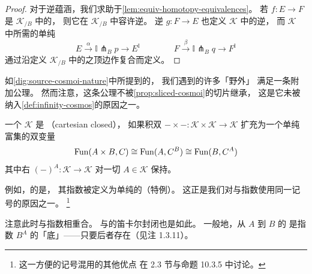 \begin{proof}
对于逆蕴涵，我们求助于\cref{lem:equiv-homotopy-equivalences}。
若 $f\colon E\to F$ 是 $\mathcal{K}_{/B}$ 中的\trEquivalence{}，
则它在 $\mathcal{K}_{/B}$ 中容许\trHomotopy{}逆。
逆\trEquivalence{} $g\colon F\to E$ 也定义 $\mathcal{K}$ 中的逆\trEquivalence{}，
而 $\mathcal{K}$ 中所需的单纯\trHomotopy
\begin{equation*}
E\xrightarrow{\ \alpha\ }\mathbb{I}\pitchfork_B p\longrightarrow E^{\mathbb{I}}
\qquad\qquad
F\xrightarrow{\ \beta\ }\mathbb{I}\pitchfork_B q\longrightarrow F^{\mathbb{I}}
\end{equation*}
通过沿定义 $\mathcal{K}_{/B}$ 中\trCotensor{}的\trPullback{}之顶边作复合而定义。
\end{proof}

如\cref{dig:source-cosmoi-nature}中所提到的，
我们遇到的许多「野外」\trInfinityCosmos{}%
满足一条附加公理。
然而注意，这条公理不被\cref{prop:sliced-cosmoi}的切片\trInfinityCosmos{}继承，
这是它未被纳入\cref{def:infinity-cosmos}的原因之一。

\begin{definition}[\trCartesianClosed\trInfinityCosmos]\label{def:cartesian-closed-cosmoi}
一个\trInfinityCosmos{} $\mathcal{K}$ 是\textbf{\trCartesianClosed}
（cartesian closed），
如果积双\trFunctor{} $-\times-\colon\mathcal{K}\times\mathcal{K}\to\mathcal{K}$
扩充为一个单纯富集的双变量\trAdjunction
\begin{equation*}
\operatorname{Fun}(A\times B,C)\cong\operatorname{Fun}(A,C^B)\cong\operatorname{Fun}(B,C^A)
\end{equation*}
其中右\trAdjunction{} $(-)^A\colon\mathcal{K}\to\mathcal{K}$
对一切 $A\in\mathcal{K}$ 保持\trIsofibration{}。
\end{definition}
例如，\trQuasiCategory{}的\trInfinityCosmos{}是\trCartesianClosed{}，
其指数被定义为单纯\trCotensor{}的（特例）。
这正是我们对\trCotensor{}与指数使用同一记号的原因之一。
\footnote{这一方便的记号混用的其他优点
在 2.3 节与命题 10.3.5 中讨论。}

注意此时\trFunctorSpace{}与指数相重合。
\trCategory{}与\trKanComplex{}的笛卡尔封闭\trInfinityCosmos{}也是如此。
一般地，从 $A$ 到 $B$ 的\trFunctorSpace
是指数 $B^A$ 的「底\trQuasiCategory」——只要后者存在（见注 1.3.11）。

